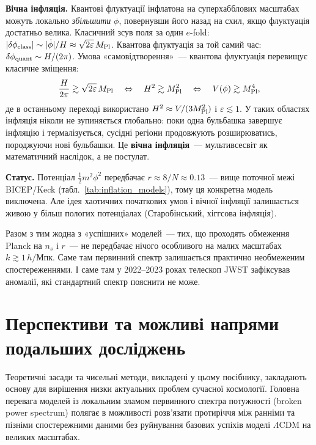 \documentclass[12pt, a4paper]{article}
\begin{document}
\textbf{Вічна інфляція.} Квантові флуктуації інфлатона на
суперхабблових масштабах можуть локально \emph{збільшити} $\phi$,
повернувши його назад на схил, якщо флуктуація достатньо велика.
Класичний зсув поля за один $e$-fold: $|\delta\phi_{\rm class}|
\sim |\dot\phi|/H \approx \sqrt{2\varepsilon}\,M_{\rm Pl}$.
Квантова флуктуація за той самий час: $\delta\phi_{\rm quant}
\sim H/(2\pi)$. Умова «самовідтворення»~---
квантова флуктуація перевищує класичне зміщення:
\begin{equation*}
  \frac{H}{2\pi} \gtrsim \sqrt{2\varepsilon}\,M_{\rm Pl}
  \quad\Leftrightarrow\quad
  H^2 \gtrsim M_{\rm Pl}^2
  \quad\Leftrightarrow\quad
  V(\phi) \gtrsim M_{\rm Pl}^4,
\end{equation*}
де в останньому переході використано $H^2 \approx V/(3M_{\rm Pl}^2)$
і $\varepsilon \lesssim 1$.
У таких областях інфляція ніколи не зупиняється глобально:
поки одна бульбашка завершує інфляцію і термалізується,
сусідні регіони продовжують розширюватись, породжуючи нові
бульбашки. Це \textbf{вічна інфляція}~--- мультивсесвіт
як математичний наслідок, а не постулат.

\textbf{Статус.} Потенціал $\tfrac{1}{2}m^2\phi^2$ передбачає
$r \approx 8/N \approx 0.13$~--- вище поточної межі BICEP/Keck
(табл.~\ref{tab:inflation_models}), тому ця конкретна модель
виключена. Але ідея хаотичних початкових умов і вічної інфляції
залишається живою у більш пологих потенціалах (Старобінський,
хіггсова інфляція).

Разом з тим жодна з «успішних» моделей~--- тих, що проходять
обмеження Planck на $n_s$ і $r$~--- не передбачає нічого
особливого на малих масштабах $k \gtrsim 1\,h/$Мпк. Саме там
первинний спектр залишається практично необмеженим
спостереженнями. І саме там у 2022--2023 роках телескоп JWST
зафіксував аномалії, які стандартний спектр пояснити не може.


\section{Перспективи та можливі напрями подальших досліджень}
\label{sec:future_research}

Теоретичні засади та чисельні методи, викладені у цьому посібнику, закладають основу для вирішення низки актуальних проблем сучасної космології. Головна перевага моделей із локальним зламом первинного спектра потужності (broken power spectrum) полягає в можливості розв'язати протиріччя між ранніми та пізніми спостережними даними без руйнування базових успіхів моделі $\Lambda$CDM на великих масштабах.
\end{document}
